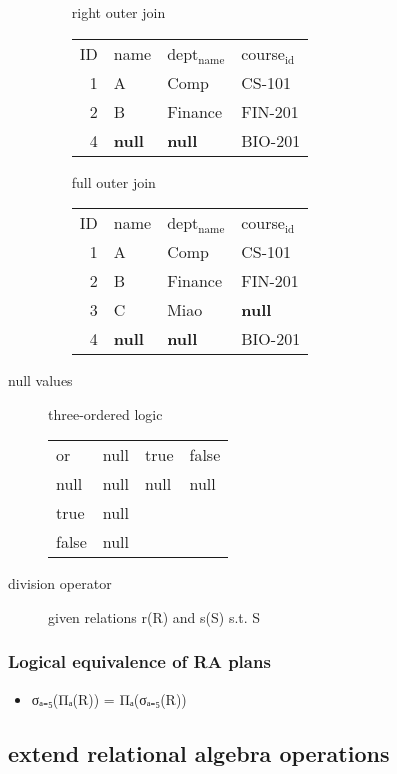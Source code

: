 \documentclass[11pt]{article}
\begin{document}
\begin{description}
\begin{itemize}
\begin{center}
\begin{tabular}{rlll}
\end{tabular}
\end{center}
right outer join
\begin{center}
\begin{tabular}{rlll}
ID & name & dept$_{\text{name}}$ & course$_{\text{id}}$\\
1 & A & Comp & CS-101\\
2 & B & Finance & FIN-201\\
4 & \textbf{null} & \textbf{null} & BIO-201\\
\end{tabular}
\end{center}
full outer join
\begin{center}
\begin{tabular}{rlll}
ID & name & dept$_{\text{name}}$ & course$_{\text{id}}$\\
1 & A & Comp & CS-101\\
2 & B & Finance & FIN-201\\
3 & C & Miao & \textbf{null}\\
4 & \textbf{null} & \textbf{null} & BIO-201\\
\end{tabular}
\end{center}
\end{itemize}
\item[{null values}] three-ordered logic
\begin{center}
\begin{tabular}{llll}
or\and & null & true & false\\
null & null & null & null\\
true & null &  & \\
false & null &  & \\
\end{tabular}
\end{center}
\item[{division operator}] given relations r(R) and s(S) s.t. S
\end{description}
\subsubsection{Logical equivalence of RA plans}
\label{sec-4-1-8}
\begin{itemize}
\item σₐ₌₅(Πₐ(R)) = Πₐ(σₐ₌₅(R))
\end{itemize}
\subsection{extend relational algebra operations}
\label{sec-4-2}
\end{document}
